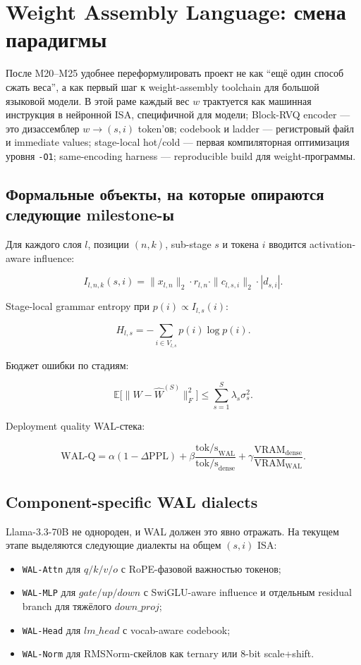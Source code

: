 \section{Weight Assembly Language: смена парадигмы}

После M20--M25 удобнее переформулировать проект не как ``ещё один способ сжать
веса'', а как первый шаг к weight-assembly toolchain для большой языковой модели.
В этой раме каждый вес $w$ трактуется как машинная инструкция в нейронной ISA,
специфичной для модели; Block-RVQ encoder --- это дизассемблер $w \to (s,i)$
token'ов; codebook и ladder --- регистровый файл и immediate values;
stage-local hot/cold --- первая компиляторная оптимизация уровня \texttt{-O1};
same-encoding harness --- reproducible build для weight-программы.

\subsection{Формальные объекты, на которые опираются следующие milestone-ы}

Для каждого слоя $l$, позиции $(n,k)$, sub-stage $s$ и токена $i$ вводится
activation-aware influence:

$$ I_{l,n,k}(s,i) = \| x_{l,n} \|_2 \cdot r_{l,n} \cdot \| c_{l,s,i} \|_2 \cdot |d_{s,i}|. $$

Stage-local grammar entropy при $p(i) \propto I_{l,s}(i)$:

$$ H_{l,s} = - \sum_{i \in V_{l,s}} p(i) \log p(i). $$

Бюджет ошибки по стадиям:

$$ \mathbb{E}\big[\| W - \hat W^{(S)} \|_F^2\big] \le \sum_{s=1}^S \lambda_s \sigma_s^2. $$

Deployment quality WAL-стека:

$$ \mathrm{WAL\text{-}Q} = \alpha (1 - \Delta\mathrm{PPL}) + \beta \frac{\mathrm{tok/s}_{\mathrm{WAL}}}{\mathrm{tok/s}_{\mathrm{dense}}} + \gamma \frac{\mathrm{VRAM}_{\mathrm{dense}}}{\mathrm{VRAM}_{\mathrm{WAL}}}. $$

\subsection{Component-specific WAL dialects}

Llama-3.3-70B не однороден, и WAL должен это явно отражать. На текущем этапе
выделяются следующие диалекты на общем $(s,i)$ ISA:

\begin{itemize}[leftmargin=1.5em]
\item \texttt{WAL-Attn} для $q/k/v/o$ с RoPE-фазовой важностью токенов;
\item \texttt{WAL-MLP} для $gate/up/down$ с SwiGLU-aware influence и
отдельным residual branch для тяжёлого $down\_proj$;
\item \texttt{WAL-Head} для $lm\_head$ с vocab-aware codebook;
\item \texttt{WAL-Norm} для RMSNorm-скейлов как ternary или 8-bit scale+shift.
\end{itemize}